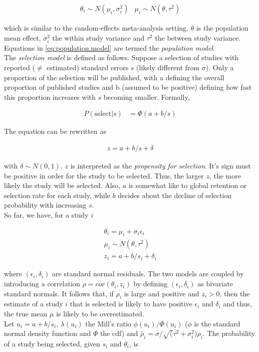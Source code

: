 \documentclass[11pt,a4paper,twoside]{book}\usepackage[]{graphicx}\usepackage[]{color}
\begin{document}
\begin{align}
\theta_i \sim N(\mu_i, \sigma_i^2) &
\mu_i \sim N(\theta, \tau^2) \label{eq:population.model}
\end{align}

which is similar to the random-effects meta-analysis setting. $\theta$ is the population mean effect, $\sigma_i^2$ the within study variance and $\tau^2$ the between study variance. Equations in \ref{eq:population.model} are termed the \textit{population model}. \\
The \textit{selection model} is defined as follows. Suppose a selection of studies with reported ($\neq$ estimated) standard errors $s$ (likely different from $\sigma$). Only a proportion of the selection will be published, with a defining the overall proportion of published studies and b (assumed to be positive) defining how fast this proportion increases with $s$ becoming smaller. Formally,

\begin{align}
P(\textrm{select}|s) &= \Phi(a + b/s) \nonumber %
\end{align}

The equation can be rewritten as 

\begin{align}
z = a + b/s + \delta \nonumber %
\end{align}

with $\delta \sim N(0,1)$. $z$ is interpreted as the \textit{propensity for selection}. It's sign must be positive in order for the study to be selected. Thus, the larger $z$, the more likely the study will be selected. Also, $a$ is somewhat like to global retention or selection rate for each study, while $b$ decides about the decline of selection probability with increasing $s$.\\
So far, we have, for a study $i$

\begin{align}
\theta_i = \mu_i + \sigma_i\epsilon_i \nonumber \\ 
\mu_i \sim N(\theta, \tau^2) \nonumber \\
z_i = a + b/s_i + \delta_i \nonumber
\end{align}

where $(\epsilon_i, \delta_i)$ are standard normal residuals. The two models are coupled by introducing a correlation $\rho = cor(\theta_i, z_i)$ by defining $(\epsilon_i, \delta_i)$ as bivariate standard normals. It follows that,
if $\rho_i$ is large and positive and $z_i > 0$, then the estimate of a study $i$ that is selected is likely to have positive $\epsilon_i$ and $\delta_i$ and thus, the true mean $\mu$ is likely to be overestimated. \\
Let $u_i = a + b/s_i$, $\lambda(u_i)$ the Mill's ratio $\phi(u_i)/\Phi(u_i)$ ($\phi$ is the standard normal density function and $\Phi$ the cdf) and $\tilde{\rho_i} = \sigma/\sqrt(\tau^2 + \sigma_i^2) \rho_i$. The probability of a study being selected, given $s_i$ and $\theta_i$, is
\end{document}
